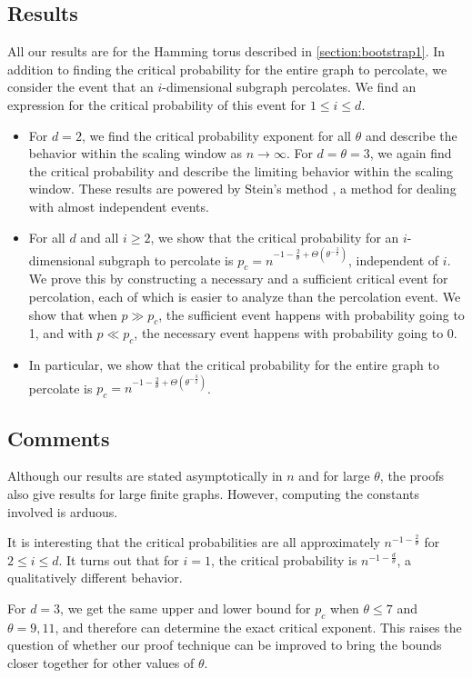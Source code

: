 \subsection{Results}
All our results are for the Hamming torus described in \ref{section:bootstrap1}. 
In addition to finding the critical probability for the entire graph to percolate, we consider the event that an $i$-dimensional subgraph percolates.
We find an expression for the critical probability of this event for $1 \le i \le d$.
\begin{itemize}
\item For $d=2$, we find the critical probability exponent for all $\theta$ and describe the behavior within the scaling window as $n \to \infty$.
For $d=\theta = 3$, we again find the critical probability and describe the limiting behavior within the scaling window.
These results are powered by Stein's method \cite{poissonbook}, a method for dealing with almost independent events.
\item For all $d$ and all $i \ge 2$, we show that the critical probability for an $i$-dimensional subgraph to percolate is $p_c = n^{-1-\frac{2}{\theta} + \Theta(\theta^{-\frac{3}{2}})}$, independent of $i$.
We prove this by constructing a necessary and a sufficient critical event for percolation, each of which is easier to analyze than the percolation event.
We show that when $p \gg p_c$, the sufficient event happens with probability going to 1, and with $p \ll p_c$, the necessary event happens with probability going to 0.
\item In particular, we show that the critical probability for the entire graph to percolate is $p_c = n^{-1-\frac{2}{\theta} + \Theta(\theta^{-\frac{3}{2}})}$.
\end{itemize}

\subsection{Comments}
Although our results are stated asymptotically in $n$ and for large $\theta$, the proofs also give results for large finite graphs.
However, computing the constants involved is arduous. 

It is interesting that the critical probabilities are all approximately $n^{-1-\frac{2}{\theta}}$ for $2 \le i \le d$.
It turns out that for $i=1$, the critical probability is $n^{-1-\frac{d}{\theta}}$, a qualitatively different behavior.

For $d = 3$, we get the same upper and lower bound for $p_c$ when $\theta \le 7$ and $\theta = 9, 11$, and therefore can determine the exact critical exponent.
This raises the question of whether our proof technique can be improved to bring the bounds closer together for other values of $\theta$.

